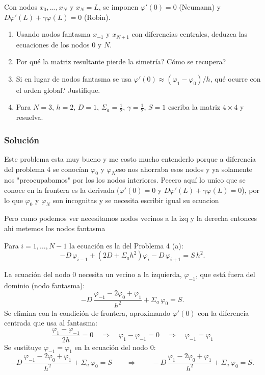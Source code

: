 
\begin{enunciado}
	Con nodos $x_0, \dots, x_N$ y $x_N = L$, se imponen $\varphi'(0) = 0$ (Neumann) y
	$D\varphi'(L) + \gamma\varphi(L) = 0$ (Robin).
	\begin{enumerate}[label=(\alph*)]
		\item Usando nodos fantasma $x_{-1}$ y $x_{N+1}$ con diferencias centrales, deduzca las
		ecuaciones de los nodos $0$ y $N$.
		\item Por qué la matriz resultante pierde la simetría? Cómo se recupera?
		\item Si en lugar de nodos fantasma se usa $\varphi'(0) \approx (\varphi_1 - \varphi_0)/h$,
		qué ocurre con el orden global? Justifique.
		\item Para $N = 3$, $h = 2$, $D = 1$, $\Sigma_a = \tfrac12$, $\gamma = \tfrac12$, $S = 1$
		escriba la matriz $4\times4$ y resuelva.
	\end{enumerate}
\end{enunciado}


\subsubsection*{Solución}

Este problema esta muy bueno y me costo mucho entenderlo porque a diferencia del problema 4 se conocían $\varphi_0$ y $\varphi_N$eso nos ahorraba esos nodos y ya solamente nos "preocupabamos" por los los nodos interiores. Peeero aquí lo unico que se conoce en la frontera es la derivada ($\varphi'(0) = 0$ y $D\varphi'(L) + \gamma\varphi(L) = 0$), por lo que $\varphi_0$ y $\varphi_N$ son incognitas y se necesita escribir igual su ecuacion 

Pero como podemos ver necesitamos nodos vecinos a la izq y la derecha entonces ahi metemos los nodos fantasma




Para $i = 1, \dots, N-1$ la ecuación es la del Problema 4 (a):
\[
-D\,\varphi_{i-1} + \left(2D + \Sigma_a h^2\right)\varphi_i - D\,\varphi_{i+1} = S\,h^2 .
\]

La ecuación del nodo $0$ necesita un vecino a la izquierda, $\varphi_{-1}$, que está fuera del dominio (nodo fantasma):
\[
-D\,\frac{\varphi_{-1} - 2\varphi_0 + \varphi_1}{h^2} + \Sigma_a\,\varphi_0 = S .
\]
Se elimina con la condición de frontera, aproximando $\varphi'(0)$ con la diferencia centrada que usa al fantasma:
\[
\frac{\varphi_1 - \varphi_{-1}}{2h} = 0
\quad\Longrightarrow\quad
\varphi_1 - \varphi_{-1} = 0
\quad\Longrightarrow\quad
\varphi_{-1} = \varphi_1
\]
Se sustituye $\varphi_{-1} = \varphi_1$ en la ecuación del nodo $0$:
\[
-D\,\frac{\varphi_{-1} - 2\varphi_0 + \varphi_1}{h^2} + \Sigma_a\,\varphi_0 = S
\qquad\Longrightarrow\qquad
-D\,\frac{\varphi_1 - 2\varphi_0 + \varphi_1}{h^2} + \Sigma_a\,\varphi_0 = S .
\]

